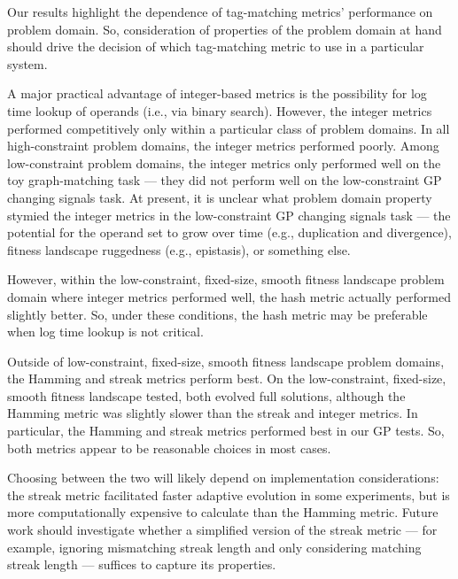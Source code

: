 Our results highlight the dependence of tag-matching metrics' performance on  problem domain.
So, consideration of properties of the problem domain at hand should drive the decision of which tag-matching metric to use in a particular system.

A major practical advantage of integer-based metrics is the possibility for log time lookup of operands (i.e., via binary search).
However, the integer metrics performed competitively only within a particular class of problem domains.
In all high-constraint problem domains, the integer metrics performed poorly.
Among low-constraint problem domains, the integer metrics only performed well on the toy graph-matching task --- they did not perform well on the low-constraint GP changing signals task.
At present, it is unclear what problem domain property stymied the integer metrics in the low-constraint GP changing signals task --- the potential for the operand set to grow over time (e.g., duplication and divergence), fitness landscape ruggedness (e.g., epistasis), or something else.

However, within the low-constraint, fixed-size, smooth fitness landscape problem domain where integer metrics performed well, the hash metric actually performed slightly better.
So, under these conditions, the hash metric may be preferable when log time lookup is not critical.

Outside of low-constraint, fixed-size, smooth fitness landscape problem domains, the Hamming and streak metrics perform best.
On the low-constraint, fixed-size, smooth fitness landscape tested, both evolved full solutions, although the Hamming metric was slightly slower than the streak and integer metrics.
In particular, the Hamming and streak metrics performed best in our GP tests.
So, both metrics appear to be reasonable choices in most cases.

Choosing between the two will likely depend on implementation considerations: the streak metric facilitated faster adaptive evolution in some experiments, but is more computationally expensive to calculate than the Hamming metric.
Future work should investigate whether a simplified version of the streak metric --- for example, ignoring mismatching streak length and only considering matching streak length --- suffices to capture its properties.

